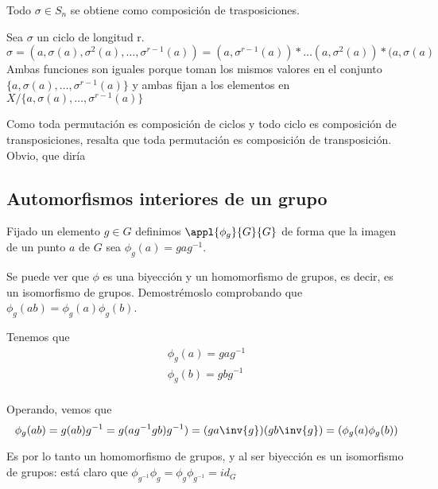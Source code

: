 \documentclass[nochap]{apuntes}
\begin{document}
\begin{theorem}
Todo $\sigma \in S_n$ se obtiene como composición de trasposiciones.
\end{theorem}

\begin{example}
Sea $\sigma$ un ciclo de longitud r. \\
$\sigma = ( a, \sigma (a), \sigma ^2(a), \hdots, \sigma ^{r-1}(a)) =
(a, \sigma ^{r-1}(a))\ast \hdots (a, \sigma ^2(a)) \ast(a, \sigma (a) $
\\Ambas funciones son iguales porque toman los mismos valores en el conjunto \\ $\{a, \sigma (a),\hdots , \sigma ^{r-1} (a) \}$ y ambas fijan a los elementos en $X / \{a, \sigma (a),\hdots , \sigma ^{r-1} (a) \}$ 
\end{example}

\obs Como toda permutación es composición de ciclos y todo ciclo es composición de transposiciones, resalta que toda permutación es composición de transposición. Obvio, que diría \href{http://www.uam.es/personal_pdi/ciencias/dyakubov/dimitry.jpg}{\color{blue}{Dmitry}}


\subsection{Automorfismos interiores de un grupo}

Fijado un elemento $g\in G$ definimos $\appl{\phi _g}{G}{G}$ de forma que la imagen
de un punto $a$ de $G$ sea $\phi _g(a) = gag^{-1}$.

Se puede ver que $\phi$ es una biyección y un homomorfismo de grupos, es decir, es un isomorfismo de grupos. Demostrémoslo comprobando que $\phi_g(ab) = \phi_g(a)\phi_g(b)$. 

Tenemos que
\begin{gather*}
\phi _g (a) = g a g^{-1}\\
\phi _g (b) = g b g^{-1}\\
\end{gather*}

Operando, vemos que
\[ \phi _g (a b) = g (a b) g^{-1} = g (a g^{-1} g b) g^{-1}) = (ga\inv{g}) (g b \inv{g}) = (\phi _g (a) \phi _g(b)) \]

Es por lo tanto un homomorfismo de grupos, y al ser biyección es un isomorfismo de grupos: está claro que $\phi _{g^{-1}} \phi _g = \phi _g \phi _{g^{-1}} = id_G$
\end{document}
